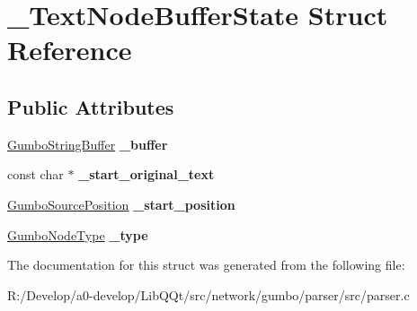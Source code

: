 \hypertarget{struct___text_node_buffer_state}{}\section{\+\_\+\+Text\+Node\+Buffer\+State Struct Reference}
\label{struct___text_node_buffer_state}
\subsection*{Public Attributes}
\begin{DoxyCompactItemize}
\item 
\mbox{\label{struct___text_node_buffer_state_a76b3092316e286944016a46b762bf2f6}} 
\mbox{\hyperlink{struct_gumbo_string_buffer}{Gumbo\+String\+Buffer}} {\bfseries \+\_\+buffer}
\item 
\mbox{\label{struct___text_node_buffer_state_a0fa3e8cfa522e4aa92e9cbe67c861e69}} 
const char $\ast$ {\bfseries \+\_\+start\+\_\+original\+\_\+text}
\item 
\mbox{\label{struct___text_node_buffer_state_a9373654954b79ce0f706a1473ca6e1a3}} 
\mbox{\hyperlink{struct_gumbo_source_position}{Gumbo\+Source\+Position}} {\bfseries \+\_\+start\+\_\+position}
\item 
\mbox{\label{struct___text_node_buffer_state_a88a5641ddf394c8ef3388ce1ab96cf9a}} 
\mbox{\hyperlink{gumbo_8h_a74e7c5d1cb8189fcfad8443ce4c44ee0}{Gumbo\+Node\+Type}} {\bfseries \+\_\+type}
\end{DoxyCompactItemize}


The documentation for this struct was generated from the following file\+:\begin{DoxyCompactItemize}
\item 
R\+:/\+Develop/a0-\/develop/\+Lib\+Q\+Qt/src/network/gumbo/parser/src/parser.\+c\end{DoxyCompactItemize}

